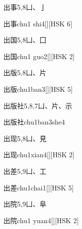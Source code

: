 \begin{entry}{出事}{5,8}{⼐、⼅}
  \begin{phonetics}{出事}{chu1 shi4}[][HSK 6]
  \end{phonetics}
\end{entry}

\begin{entry}{出国}{5,8}{⼐、⼞}
  \begin{phonetics}{出国}{chu1 guo2}[][HSK 2]
  \end{phonetics}
\end{entry}

\begin{entry}{出版}{5,8}{⼐、⽚}
  \begin{phonetics}{出版}{chu1ban3}[][HSK 5]
  \end{phonetics}
\end{entry}

\begin{entry}{出版社}{5,8,7}{⼐、⽚、⽰}
  \begin{phonetics}{出版社}{chu1ban3she4}
  \end{phonetics}
\end{entry}

\begin{entry}{出现}{5,8}{⼐、⾒}
  \begin{phonetics}{出现}{chu1xian4}[][HSK 2]
  \end{phonetics}
\end{entry}

\begin{entry}{出差}{5,9}{⼐、⼯}
  \begin{phonetics}{出差}{chu1chai1}[][HSK 5]
  \end{phonetics}
\end{entry}

\begin{entry}{出院}{5,9}{⼐、⾩}
  \begin{phonetics}{出院}{chu1 yuan4}[][HSK 2]
  \end{phonetics}
\end{entry}

